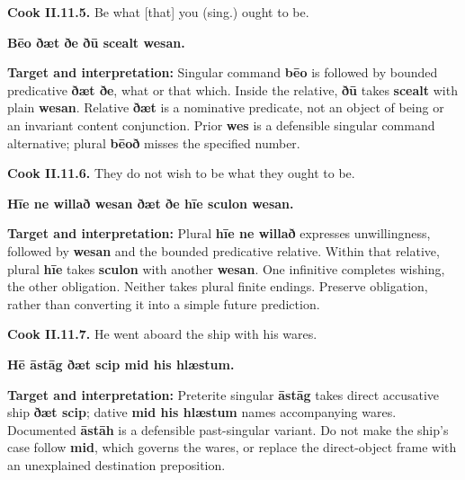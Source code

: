 \par\begin{minipage}{\linewidth}\raggedright
\textbf{Cook II.11.5.} Be what [that] you (sing.) ought to be.

\textbf{Bēo ðæt ðe ðū scealt wesan.}

\textbf{Target and interpretation:} Singular command \textbf{bēo} is followed by bounded predicative \textbf{ðæt ðe}, what or that which. Inside the relative, \textbf{ðū} takes \textbf{scealt} with plain \textbf{wesan}. Relative \textbf{ðæt} is a nominative predicate, not an object of being or an invariant content conjunction. Prior \textbf{wes} is a defensible singular command alternative; plural \textbf{bēoð} misses the specified number.

\end{minipage}\par\addvspace{4pt}

\par\begin{minipage}{\linewidth}\raggedright
\textbf{Cook II.11.6.} They do not wish to be what they ought to be.

\textbf{Hīe ne willað wesan ðæt ðe hīe sculon wesan.}

\textbf{Target and interpretation:} Plural \textbf{hīe ne willað} expresses unwillingness, followed by \textbf{wesan} and the bounded predicative relative. Within that relative, plural \textbf{hīe} takes \textbf{sculon} with another \textbf{wesan}. One infinitive completes wishing, the other obligation. Neither takes plural finite endings. Preserve obligation, rather than converting it into a simple future prediction.

\end{minipage}\par\addvspace{4pt}

\par\begin{minipage}{\linewidth}\raggedright
\textbf{Cook II.11.7.} He went aboard the ship with his wares.

\textbf{Hē āstāg ðæt scip mid his hlæstum.}

\textbf{Target and interpretation:} Preterite singular \textbf{āstāg} takes direct accusative ship \textbf{ðæt scip}; dative \textbf{mid his hlæstum} names accompanying wares. Documented \textbf{āstāh} is a defensible past-singular variant. Do not make the ship's case follow \textbf{mid}, which governs the wares, or replace the direct-object frame with an unexplained destination preposition.

\end{minipage}\par\addvspace{4pt}

